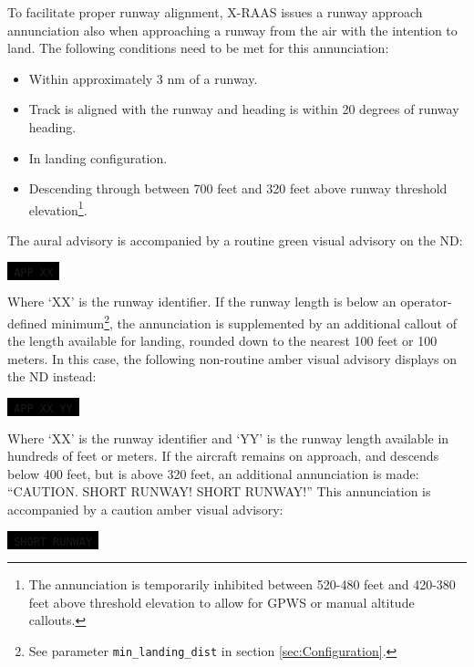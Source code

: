 \documentclass[a4paper,12pt]{article}
\newcommand{\visualadvisory}[3][b]{%
    \ifthenelse{\equal{#1}{b}}{\begin{center}}{}
    \noindent
    \colorbox{black}{\textcolor{#2visualadvisorycolor}{\large\texttt{~#3~}}}
    \ifthenelse{\equal{#1}{b}}{\end{center}}{}}
\newcommand{\confopt}[1]{\texttt{#1}}
\begin{document}
To facilitate proper runway alignment, X-RAAS issues a runway approach
annunciation also when approaching a runway from the air with the
intention to land. The following conditions need to be met for this
annunciation:

\begin{itemize}

\item Within approximately 3 nm of a runway.

\item Track is aligned with the runway and heading is within 20 degrees
of runway heading.

\item In landing configuration.

\item Descending through between 700 feet and 320 feet above runway
threshold elevation\footnote{The annunciation is temporarily inhibited
between 520-480 feet and 420-380 feet above threshold elevation to allow
for GPWS or manual altitude callouts.}.

\end{itemize}

\noindent The aural advisory is accompanied by a routine green visual
advisory on the ND:

\visualadvisory{routine}{APP XX}

\noindent Where `XX' is the runway identifier. If the runway length is
below an operator-defined minimum\footnote{See parameter
\confopt{min\_landing\_dist} in section \ref{sec:Configuration}.}, the
annunciation is supplemented by an additional callout of the length
available for landing, rounded down to the nearest 100 feet or 100
meters. In this case, the following non-routine amber visual advisory
displays on the ND instead:

\visualadvisory{nonroutine}{APP XX YY}

\noindent Where `XX' is the runway identifier and `YY' is the runway
length available in hundreds of feet or meters. If the aircraft remains
on approach, and descends below 400 feet, but is above 320 feet, an
additional annunciation is made: ``CAUTION. SHORT RUNWAY! SHORT RUNWAY!''
This annunciation is accompanied by a caution amber visual advisory:

\visualadvisory{nonroutine}{SHORT RUNWAY}
\end{document}
